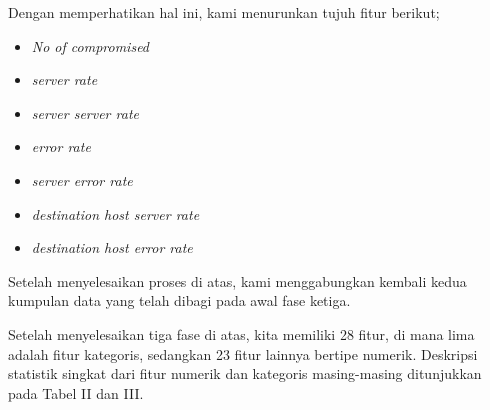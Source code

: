 \documentclass[conference]{IEEEtran}
\begin{document}
\noindent Dengan memperhatikan hal ini, kami menurunkan tujuh fitur berikut;

\begin{itemize}
    \item \emph{No of compromised}
    \item \emph{server rate}
    \item \emph{server server rate}
    \item \emph{error rate}
    \item \emph{server error rate}
    \item \emph{destination host server rate}
    \item \emph{destination host error rate}
\end{itemize}

\noindent Setelah menyelesaikan proses di atas, kami menggabungkan kembali kedua kumpulan data yang telah dibagi pada awal fase ketiga.

\noindent Setelah menyelesaikan tiga fase di atas, kita memiliki 28 fitur, di mana lima adalah fitur kategoris, sedangkan 23 fitur lainnya bertipe numerik. Deskripsi statistik singkat dari fitur numerik dan kategoris masing-masing ditunjukkan pada Tabel II dan III.
\end{document}
